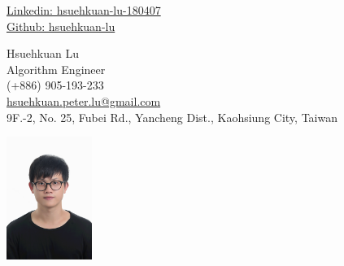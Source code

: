 \begin{center}
	\begin{minipage}[b]{0.24\textwidth}
		{\href{https://www.linkedin.com/in/hsuehkuan-lu-180407/}{Linkedin: hsuehkuan-lu-180407} } \\
		\href{https://github.com/hsuehkuan-lu}{Github: hsuehkuan-lu}
		
	\end{minipage}%
	\begin{minipage}[b]{0.5\textwidth}
		\centering
		{\HUGE Hsuehkuan Lu} \\ %
		\vspace{0.1cm}
		{\color{UI_blue} \Large{Algorithm Engineer}} \\
		\large (+886) 905-193-233 \\
		\large \href{mailto:hsuehkuan.peter.lu@gmail.com}{hsuehkuan.peter.lu@gmail.com} \\
		\small 9F.-2, No. 25, Fubei Rd., Yancheng Dist., Kaohsiung City, Taiwan \\
	\end{minipage}%
	\begin{minipage}[b]{0.24\textwidth}
		\flushright \large  %
		\includegraphics[width=2.8cm, height=4cm]{images/me.jpg}
	\end{minipage}   
	
\end{center}